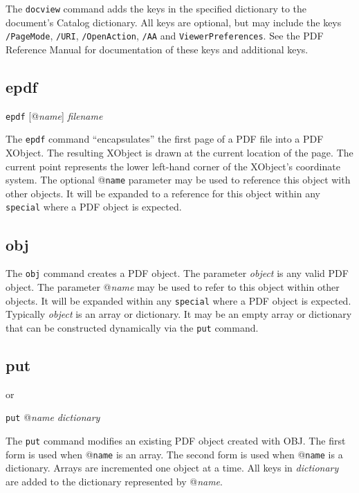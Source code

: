 The {\tt docview} command adds the keys in the specified dictionary to the
document's Catalog dictionary.  All keys are optional, but may include
the keys {\tt /PageMode},
{\tt /URI}, {\tt /OpenAction}, {\tt /AA}
and {\tt ViewerPreferences}.  See the PDF Reference Manual
for documentation of these keys and additional keys.

\subsection{epdf}

{\tt epdf} [@{\it name}] {\it filename}

The {\tt epdf} command ``encapsulates'' the first page of a PDF
file into a PDF XObject.  The resulting XObject is drawn
at the current location of the page.  The current point
represents the lower left-hand corner of the XObject's coordinate
system.  The optional @{\tt name} parameter may be used
to reference this object with other objects.
It will be expanded to a reference for this object
within any {\tt special} where a PDF object is expected.

\subsection{obj}


The {\tt obj} command creates a
PDF object.  The parameter {\it object} is any valid PDF object.  The parameter @{\it name}
may be used to refer to this object within other objects.
It will be expanded within any {\tt special} where a PDF object is expected.
Typically {\it object} is an array or dictionary.  It may be an empty array or
dictionary that can be constructed dynamically via the {\tt put} command.

\subsection{put}

or 

{\tt put} @{\it name} {\it dictionary}

The {\tt put} command modifies an existing PDF object created with OBJ.
The first form is used when @{\tt name} is an array.  The second
form is used when @{\tt name} is a dictionary.  Arrays are
incremented one object at a time.  All keys in {\it dictionary}
are added to the dictionary represented by @{\it name}.

